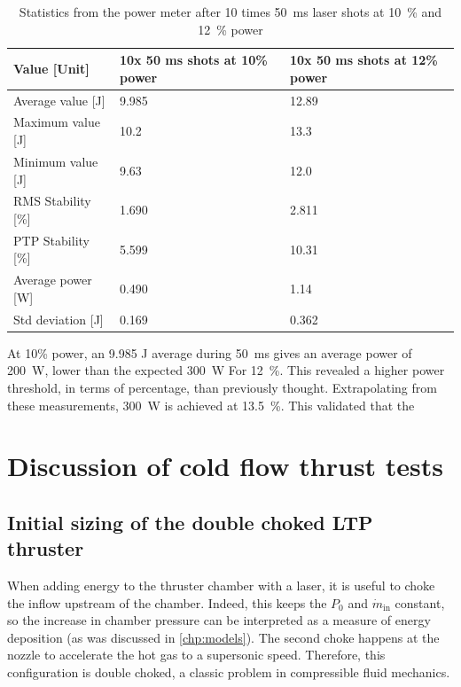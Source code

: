         \begin{table}[!ht]
            \caption{Statistics from the power meter after 10 times \qty{50}{ms} laser shots at \qty{10}{\%} and \qty{12}{\%} power}
            \label{tab:laser shot statistics}
            \begin{tabular}{lll}
            \textbf{Value {[}Unit{]}} & \textbf{10x 50 ms shots at 10\% power} & \textbf{10x 50 ms shots at 12\% power} \\ \hline
            Average value {[}J{]}  & 9.985 & 12.89 \\
            Maximum value {[}J{]}  & 10.2  & 13.3  \\
            Minimum value {[}J{]}  & 9.63  & 12.0  \\
            RMS Stability {[}\%{]} & 1.690 & 2.811 \\
            PTP Stability {[}\%{]} & 5.599 & 10.31 \\
            Average power {[}W{]}  & 0.490 & 1.14  \\
            Std deviation {[}J{]}  & 0.169 & 0.362 \\ \hline
            \end{tabular}
        \end{table}
        
        At 10\% power, an 9.985 J average during \qty{50}{ms} gives an average power of \qty{200}{W}, lower than the expected \qty{300}{W} For \qty{12}{\%}. This revealed a higher power threshold, in terms of percentage, than previously thought. Extrapolating from these measurements, \qty{300}{W} is achieved at \qty{13.5}{\%}. This validated that the

\section{Discussion of cold flow thrust tests}

    \subsection{Initial sizing of the double choked LTP thruster}

            When adding energy to the thruster chamber with a laser, it is useful to choke the inflow upstream of the chamber. Indeed, this keeps the $P_0$ and $\dot{m}_\mathrm{in}$ constant, so the increase in chamber pressure can be interpreted as a measure of energy deposition (as was discussed in \autoref{chp:models}). The second choke happens at the nozzle to accelerate the hot gas to a supersonic speed. Therefore, this configuration is double choked, a classic problem in compressible fluid mechanics.
            
